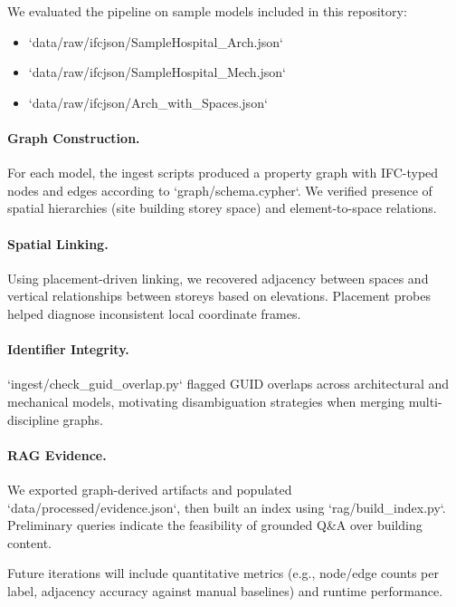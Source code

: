 We evaluated the pipeline on sample models included in this repository:

\begin{itemize}[leftmargin=*]
  \item `data/raw/ifcjson/SampleHospital_Arch.json`
  \item `data/raw/ifcjson/SampleHospital_Mech.json`
  \item `data/raw/ifcjson/Arch_with_Spaces.json`
\end{itemize}

\paragraph{Graph Construction.} For each model, the ingest scripts produced a property graph with IFC-typed nodes and edges according to `graph/schema.cypher`. We verified presence of spatial hierarchies (site \textrightarrow{} building \textrightarrow{} storey \textrightarrow{} space) and element-to-space relations.

\paragraph{Spatial Linking.} Using placement-driven linking, we recovered adjacency between spaces and vertical relationships between storeys based on elevations. Placement probes helped diagnose inconsistent local coordinate frames.

\paragraph{Identifier Integrity.} `ingest/check_guid_overlap.py` flagged GUID overlaps across architectural and mechanical models, motivating disambiguation strategies when merging multi-discipline graphs.

\paragraph{RAG Evidence.} We exported graph-derived artifacts and populated `data/processed/evidence.json`, then built an index using `rag/build_index.py`. Preliminary queries indicate the feasibility of grounded Q\&A over building content.

Future iterations will include quantitative metrics (e.g., node/edge counts per label, adjacency accuracy against manual baselines) and runtime performance.


